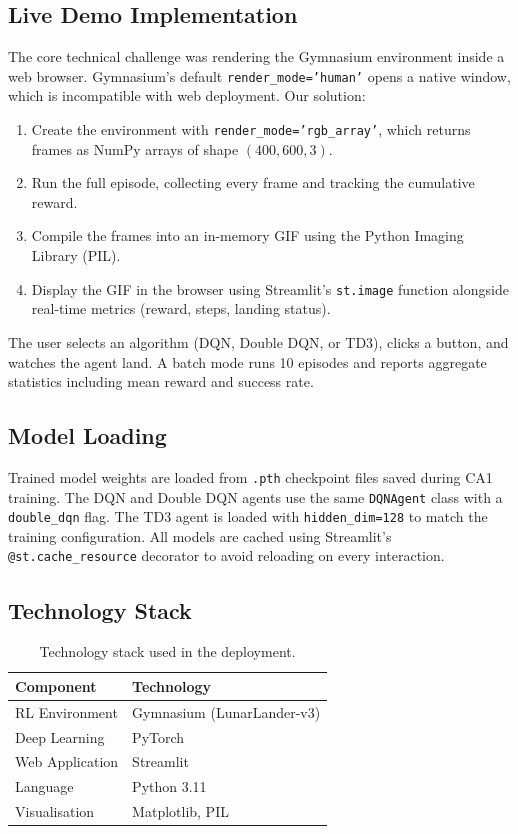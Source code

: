 \documentclass[11pt,a4paper]{article}
\begin{document}
\subsection{Live Demo Implementation}

The core technical challenge was rendering the Gymnasium environment inside a web browser. Gymnasium's default \texttt{render\_mode='human'} opens a native window, which is incompatible with web deployment. Our solution:

\begin{enumerate}
    \item Create the environment with \texttt{render\_mode='rgb\_array'}, which returns frames as NumPy arrays of shape $(400, 600, 3)$.
    \item Run the full episode, collecting every frame and tracking the cumulative reward.
    \item Compile the frames into an in-memory GIF using the Python Imaging Library (PIL).
    \item Display the GIF in the browser using Streamlit's \texttt{st.image} function alongside real-time metrics (reward, steps, landing status).
\end{enumerate}

The user selects an algorithm (DQN, Double DQN, or TD3), clicks a button, and watches the agent land. A batch mode runs 10 episodes and reports aggregate statistics including mean reward and success rate.

\subsection{Model Loading}

Trained model weights are loaded from \texttt{.pth} checkpoint files saved during CA1 training. The DQN and Double DQN agents use the same \texttt{DQNAgent} class with a \texttt{double\_dqn} flag. The TD3 agent is loaded with \texttt{hidden\_dim=128} to match the training configuration. All models are cached using Streamlit's \texttt{@st.cache\_resource} decorator to avoid reloading on every interaction.

\subsection{Technology Stack}

\begin{table}[H]
\centering
\begin{tabular}{ll}
\toprule
\textbf{Component} & \textbf{Technology} \\
\midrule
RL Environment & Gymnasium (LunarLander-v3) \\
Deep Learning & PyTorch \\
Web Application & Streamlit \\
Language & Python 3.11 \\
Visualisation & Matplotlib, PIL \\
\bottomrule
\end{tabular}
\caption{Technology stack used in the deployment.}
\end{table}
\end{document}
